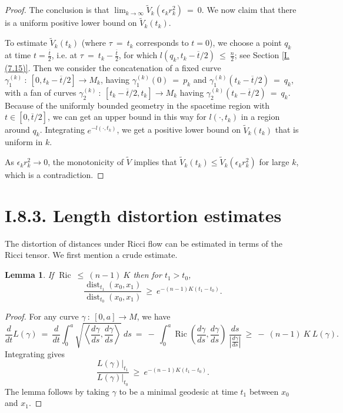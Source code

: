 \documentclass[12pt]{amsart}
\newcommand{\dist}{\operatorname{dist}}
\newcommand{\Ric}{\operatorname{Ric}}
\numberwithin{equation}{section}
\theoremstyle{plain}
\newtheorem{lemma}[equation]{Lemma}
\theoremstyle{definition}
\theoremstyle{remark}
\begin{document}
\begin{proof}
The conclusion is that $\lim_{k \rightarrow \infty} 
\tilde{V}_k(\epsilon_k r_k^2) \: = \: 0$. We now claim that there is a
uniform positive lower bound on $\tilde{V}_k(t_k)$.

To estimate $\tilde{V}_k(t_k)$ (where $\tau \: = \: t_k$ corresponds to
$t = 0$), we choose a point $q_k$ at time $t = \frac{\overline{t}}{2}$, i.e. at
$\tau \: = \: t_k - \frac{\overline{t}}{2}$, for which 
$l(q_k, t_k - \overline{t}/2) 
\: \le \: \frac{n}{2}$; see Section \ref{I.(7.15)}. Then we consider the concatenation of a
fixed curve $\gamma^{(k)}_1 \: : \: 
[0,   t_k - \overline{t}/2] \rightarrow M_k$, having
$\gamma^{(k)}_1(0) \: = \: p_k$ and 
$\gamma^{(k)}_1(t_k - \overline{t}/2) \: = \: q_k$, 
with a fan of curves 
$\gamma^{(k)}_2 \: : \: [t_k - \overline{t}/2, t_k] \rightarrow M_k$
having $\gamma^{(k)}_2(t_k - \overline{t}/2) \: = \: q_k$. 
Because of the uniformly bounded geometry
in the spacetime region with $t \in [0, \overline{t}/2]$, 
we can get an upper bound in
this way
for $l(\cdot, t_k)$ in a region around $q_k$. Integrating 
$e^{-l(\cdot, t_k)}$, we get a positive lower bound on $\tilde{V}_k(t_k)$
that is uniform in $k$.

As
$\epsilon_k r_k^2 \rightarrow 0$, the monotonicity of $\tilde{V}$
implies that $\tilde{V}_k(t_k) \le \tilde{V}_k(\epsilon_k r_k^2)$
for large $k$, which is a contradiction.
\end{proof}

\section{I.8.3. Length distortion estimates}
\label{secI.8.3}

The distortion of distances under Ricci flow can be estimated in terms
of the Ricci tensor.
We first mention a crude estimate.

\begin{lemma} \label{crudelemma}
If $\Ric \: \le \: (n-1) \: K$ then for $t_1 > t_0$,
\begin{equation}
\frac{\dist_{t_1}(x_0, x_1)}{\dist_{t_0}(x_0, x_1)} \: \ge \:
e^{-(n-1)K(t_1-t_0)}.
\end{equation}
\end{lemma}
\begin{proof}
For any curve $\gamma \: : \: [0,a] \rightarrow M$, we have
\begin{equation}
\frac{d}{dt} L(\gamma) \: =\:
\frac{d}{dt} \int_0^a 
\sqrt{ \left\langle \frac{d\gamma}{ds}, \frac{d\gamma}{ds}
\right\rangle} \: ds \: = \:
- \: \int_0^a \Ric \left( \frac{d\gamma}{ds}, \frac{d\gamma}{ds}
\right) \: \frac{ds}{\left| \frac{d\gamma}{ds} \right|} \: \ge \:
- \: (n-1) \: K \: L(\gamma).
\end{equation}
Integrating gives
\begin{equation}
\frac{L(\gamma) \big|_{t_1}}{L(\gamma) \big|_{t_0}} \: \ge \:
e^{-(n-1)K(t_1-t_0)}.
\end{equation}
The lemma follows by taking 
$\gamma$ to be a minimal geodesic at time $t_1$ between
$x_0$ and $x_1$.
\end{proof}
\end{document}
